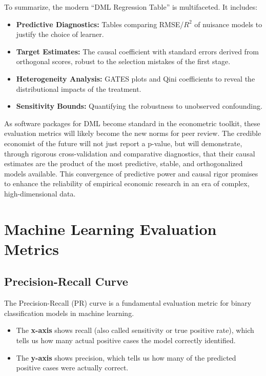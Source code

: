 \documentclass[12pt,a4paper]{article}
\begin{document}
To summarize, the modern ``DML Regression Table'' is multifaceted. It includes:
\begin{itemize}
\item \textbf{Predictive Diagnostics:} Tables comparing RMSE/$R^2$ of nuisance models to justify the choice of learner.
\item \textbf{Target Estimates:} The causal coefficient with standard errors derived from orthogonal scores, robust to the selection mistakes of the first stage.
\item \textbf{Heterogeneity Analysis:} GATES plots and Qini coefficients to reveal the distributional impacts of the treatment.
\item \textbf{Sensitivity Bounds:} Quantifying the robustness to unobserved confounding.
\end{itemize}

As software packages for DML become standard in the econometric toolkit, these evaluation metrics will likely become the new norms for peer review. The credible economist of the future will not just report a p-value, but will demonstrate, through rigorous cross-validation and comparative diagnostics, that their causal estimates are the product of the most predictive, stable, and orthogonalized models available. This convergence of predictive power and causal rigor promises to enhance the reliability of empirical economic research in an era of complex, high-dimensional data.

\section{Machine Learning Evaluation Metrics}

\subsection{Precision-Recall Curve}

The Precision-Recall (PR) curve is a fundamental evaluation metric for binary classification models in machine learning.

\begin{itemize}
\item The \textbf{x-axis} shows recall (also called sensitivity or true positive rate), which tells us how many actual positive cases the model correctly identified.
\item The \textbf{y-axis} shows precision, which tells us how many of the predicted positive cases were actually correct.
\end{itemize}
\end{document}
